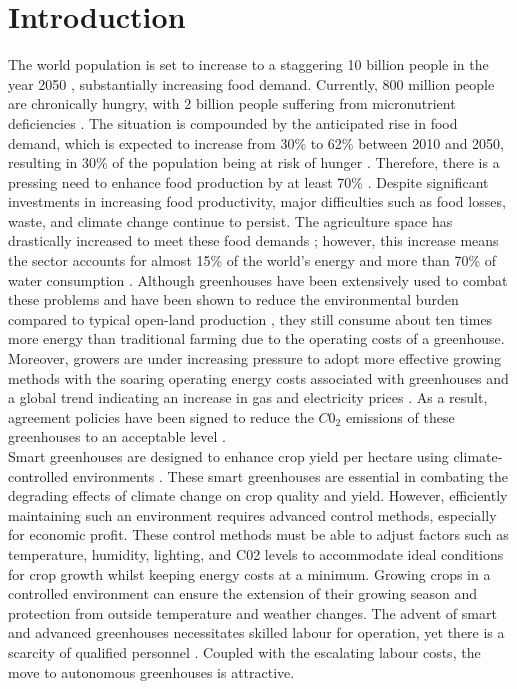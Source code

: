 \chapter{Introduction}
\label{chapter:introduction, written in the present tense}
The world population is set to increase to a staggering 10 billion people in the year 2050 \cite{blazhevskaGrowingSlowerPace2019}, substantially increasing food demand. Currently, 800 million people are chronically hungry, with 2 billion people suffering from micronutrient deficiencies \cite{faoFutureFoodAgriculture2017}. The situation is compounded by the anticipated rise in food demand, which is expected to increase from 30\% to 62\% between 2010 and 2050, resulting in 30\% of the population being at risk of hunger \cite{vandijkMetaanalysisProjectedGlobal2021}. Therefore, there is a pressing need to enhance food production by at least 70\% \cite{nishatGreenDealGreenhouse2020}. Despite significant investments in increasing food productivity, major difficulties such as food losses, waste, and climate change continue to persist\cite{faoFutureFoodAgriculture2017}. The agriculture space has drastically increased to meet these food demands \cite{winklerGlobalLandUse2021}; however, this increase means the sector accounts for almost 15\% of the world’s energy and more than 70\% of water consumption \cite{nishatGreenDealGreenhouse2020}. Although greenhouses have been extensively used to combat these problems and have been shown to reduce the environmental burden compared to typical open-land production \cite{munozComparingEnvironmentalImpacts2008}, they still consume about ten times more energy than traditional farming \cite{nishatGreenDealGreenhouse2020} due to the operating costs of a greenhouse. Moreover, growers are under increasing pressure to adopt more effective growing methods with the soaring operating energy costs associated with greenhouses and a global trend indicating an increase in gas and electricity prices \cite{alvarezWhatSoaringEnergy2021}. As a result, agreement policies have been signed to reduce the $C0_2$ emissions of these greenhouses to an acceptable level \cite{breukersPowerDutchGreenhouse}. \\

Smart greenhouses are designed to enhance crop yield per hectare using climate-controlled environments \cite{morcegoReinforcementLearningModel2023}. These smart greenhouses are essential in combating the degrading effects of climate change on crop quality and yield. However, efficiently maintaining such an environment requires advanced control methods, especially for economic profit. These control methods must be able to adjust factors such as temperature, humidity, lighting, and C02 levels to accommodate ideal conditions for crop growth \cite{devopsGreenhouseClimateControl2021} whilst keeping energy costs at a minimum. Growing crops in a controlled environment can ensure the extension of their growing season and protection from outside temperature and weather changes. The advent of smart and advanced greenhouses necessitates skilled labour for operation, yet there is a scarcity of qualified personnel \cite{rusnakWhatCurrentState2018}. Coupled with the escalating labour costs, the move to autonomous greenhouses is attractive.\\


